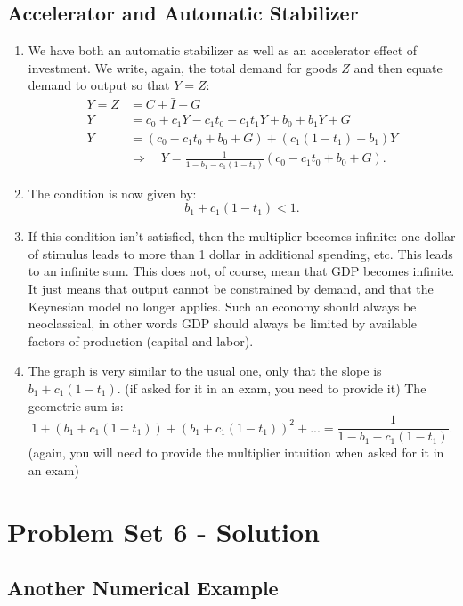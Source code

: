 \documentclass[]{book}
\begin{document}
\section{Accelerator and Automatic
Stabilizer}\label{accelerator-and-automatic-stabilizer-1}

\begin{enumerate}
\def\labelenumi{\arabic{enumi}.}
\item
  We have both an automatic stabilizer as well as an accelerator effect
  of investment. We write, again, the total demand for goods \(Z\) and
  then equate demand to output so that \(Y=Z\): \[
  \begin{aligned}
  Y=Z &=C+\bar{I}+G\\
  Y   &=c_{0}+c_{1} Y - c_1 t_0 - c_1 t_1 Y+ b_0+ b_{1}Y + G\\
  Y   &=\left(c_{0}-c_{1}t_0+b_{0}+G\right)+\left(c_{1}(1-t_1)+b_1\right)Y \\
  & \Rightarrow \quad \boxed{Y=\frac{1}{1-b_{1}-c_{1}(1-t_1)}\left(c_{0}-c_{1}t_0+b_{0}+G\right)}.
  \end{aligned}
  \]
\item
  The condition is now given by: \[b_1 + c_1(1-t_1)<1.\]
\item
  If this condition isn't satisfied, then the multiplier becomes
  infinite: one dollar of stimulus leads to more than 1 dollar in
  additional spending, etc. This leads to an infinite sum. This does
  not, of course, mean that GDP becomes infinite. It just means that
  output cannot be constrained by demand, and that the Keynesian model
  no longer applies. Such an economy should always be neoclassical, in
  other words GDP should always be limited by available factors of
  production (capital and labor).
\item
  The graph is very similar to the usual one, only that the slope is
  \(b_1+c_1(1-t_1)\). (if asked for it in an exam, you need to provide
  it) The geometric sum is:
  \[1+ \left(b_1+c_1(1-t_1)\right) + \left(b_1+c_1(1-t_1)\right)^2 + ... = \frac{1}{1-b_1-c_1(1-t_1)}.\]
  (again, you will need to provide the multiplier intuition when asked
  for it in an exam)
\end{enumerate}

\chapter{Problem Set 6 - Solution}\label{pset6-sol}

\section*{Another Numerical Example}\label{another-numerical-example-1}
\end{document}
